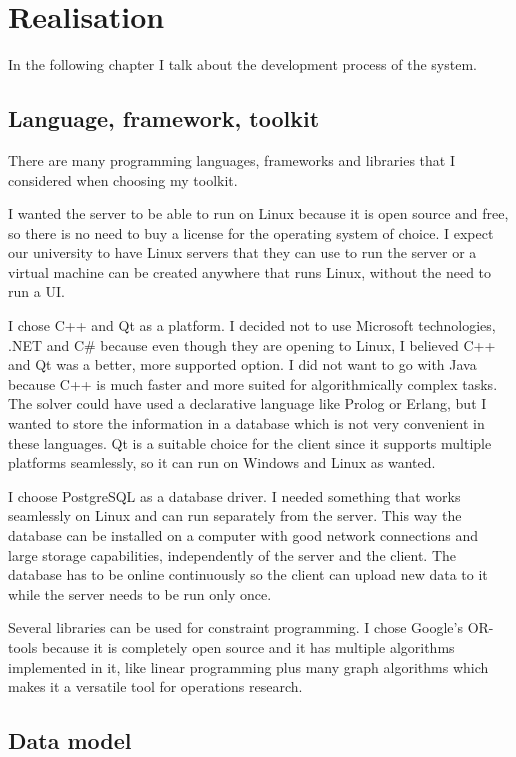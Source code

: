 \chapter{Realisation}

In the following chapter I talk about the development process of the system.

\section{Language, framework, toolkit}

There are many programming languages, frameworks and libraries that I considered when choosing my toolkit.

I wanted the server to be able to run on Linux because it is open source and free, so there is no need to buy a license for the operating system of choice. I expect our university to have Linux servers that they can use to run the server or a virtual machine can be created anywhere that runs Linux, without the need to run a UI.

I chose C++ and Qt as a platform. I decided not to use Microsoft technologies, .NET and C\# because even though they are opening to Linux, I believed C++ and Qt was a better, more supported option. I did not want to go with Java because C++ is much faster and more suited for algorithmically complex tasks. The solver could have used a declarative language like Prolog or Erlang, but I wanted to store the information in a database which is not very convenient in these languages. Qt is a suitable choice for the client since it supports multiple platforms seamlessly, so it can run on Windows and Linux as wanted.

I choose PostgreSQL as a database driver. I needed something that works seamlessly on Linux and can run separately from the server. This way the database can be installed on a computer with good network connections and large storage capabilities, independently of the server and the client. The database has to be online continuously so the client can upload new data to it while the server needs to be run only once.

Several libraries can be used for constraint programming. I chose Google's OR-tools because it is completely open source and it has multiple algorithms implemented in it, like linear programming plus many graph algorithms which makes it a versatile tool for operations research.

\section{Data model}

